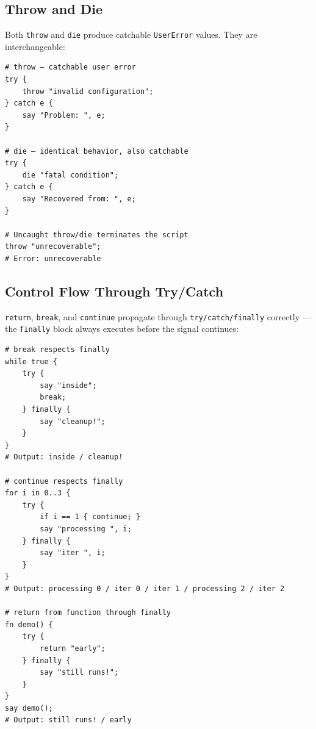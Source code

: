 \subsection{Throw and Die}

Both \texttt{throw} and \texttt{die} produce catchable \texttt{UserError} values. They are interchangeable:

\begin{tcolorbox}[colback=codebg, colframe=darkpurple, colbacktitle=darkpurple, title=\textbf{\textcolor{codegold}{Throw and Die}}, fonttitle=\bfseries, sharp corners]
\begin{lstlisting}
# throw — catchable user error
try {
    throw "invalid configuration";
} catch e {
    say "Problem: ", e;
}

# die — identical behavior, also catchable
try {
    die "fatal condition";
} catch e {
    say "Recovered from: ", e;
}

# Uncaught throw/die terminates the script
throw "unrecoverable";
# Error: unrecoverable
\end{lstlisting}
\end{tcolorbox}

\subsection{Control Flow Through Try/Catch}

\texttt{return}, \texttt{break}, and \texttt{continue} propagate through \texttt{try/catch/finally} correctly — the \texttt{finally} block always executes before the signal continues:

\begin{tcolorbox}[colback=codebg, colframe=darkpurple, colbacktitle=darkpurple, title=\textbf{\textcolor{codegold}{Control Flow with Finally}}, fonttitle=\bfseries, sharp corners]
\begin{lstlisting}
# break respects finally
while true {
    try {
        say "inside";
        break;
    } finally {
        say "cleanup!";
    }
}
# Output: inside / cleanup!

# continue respects finally
for i in 0..3 {
    try {
        if i == 1 { continue; }
        say "processing ", i;
    } finally {
        say "iter ", i;
    }
}
# Output: processing 0 / iter 0 / iter 1 / processing 2 / iter 2

# return from function through finally
fn demo() {
    try {
        return "early";
    } finally {
        say "still runs!";
    }
}
say demo();
# Output: still runs! / early
\end{lstlisting}
\end{tcolorbox}

